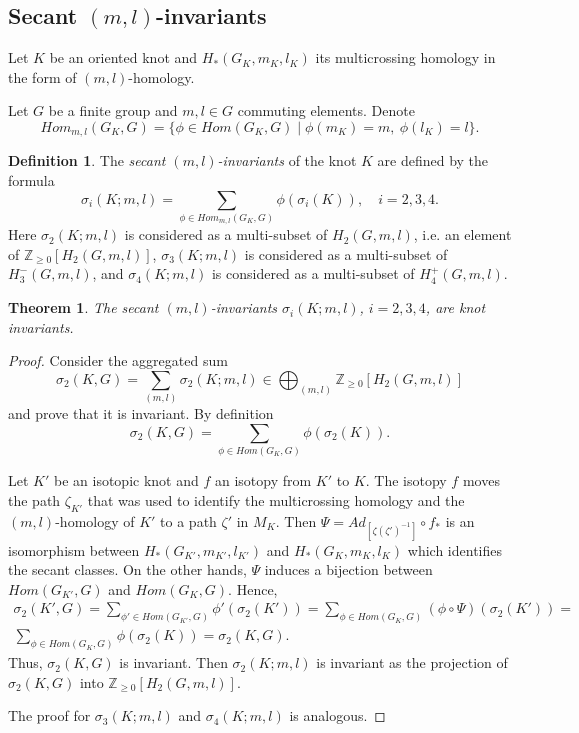 \documentclass{article}
\newtheorem{theorem}{Theorem}
\theoremstyle{definition}
\newtheorem{definition}{Definition}
\theoremstyle{remark}
\def\Z{{\mathbb Z}}
\begin{document}
\subsection{Secant $(m,l)$-invariants}

Let $K$ be an oriented knot and $H_*(G_K,m_K,l_K)$ its multicrossing homology in the form of $(m,l)$-homology.

Let $G$ be a finite group and $m,l\in G$ commuting elements. Denote
\[
Hom_{m,l}(G_K,G)=\{\phi\in Hom(G_K,G)\mid \phi(m_K)=m,\ \phi(l_K)=l\}.
\]

\begin{definition}\label{def:secant_ml_class}
    The \emph{secant $(m,l)$-invariants} of the knot $K$ are defined by the formula
\begin{equation}\label{eq:secant_ml_invariant}
    \sigma_i(K;m,l)=\sum_{\phi\in Hom_{m,l}(G_K,G)} \phi(\sigma_i(K)),\quad i=2,3,4.
\end{equation}
Here $\sigma_2(K;m,l)$ is considered as a multi-subset of $H_2(G,m,l)$, i.e. an element of $\Z_{\ge 0}[H_2(G,m,l)]$, $\sigma_3(K;m,l)$ is considered as a multi-subset of $H_3^-(G,m,l)$, and $\sigma_4(K;m,l)$ is considered as a multi-subset of $H_4^+(G,m,l)$.
\end{definition}

\begin{theorem}\label{thm:secant_ml_invariant}
    The secant $(m,l)$-invariants $\sigma_i(K;m,l)$, $i=2,3,4$, are knot invariants.
\end{theorem}
\begin{proof}
    Consider the aggregated sum
\[
\sigma_2(K,G)=\sum_{(m,l)}\sigma_2(K;m,l)\in \bigoplus_{(m,l)}\Z_{\ge 0}[H_2(G,m,l)]
\]
and prove that it is invariant. By definition
\[
\sigma_2(K,G)=\sum_{\phi\in Hom(G_K,G)} \phi(\sigma_2(K)).
\]

Let $K'$ be an isotopic knot and $f$ an isotopy from $K'$ to $K$. The isotopy $f$ moves the path $\zeta_{K'}$ that was used to identify the multicrossing homology and the $(m,l)$-homology of $K'$ to a path $\zeta'$ in $M_K$. Then $\Psi=Ad_{[\zeta(\zeta')^{-1}]}\circ f_*$ is an isomorphism between $H_*(G_{K'},m_{K'},l_{K'})$ and $H_*(G_K,m_K,l_K)$ which identifies the secant classes. On the other hands, $\Psi$ induces a bijection between $Hom(G_{K'},G)$ and $Hom(G_K,G)$. Hence,
\begin{multline*}
\sigma_2(K',G)=\sum_{\phi'\in Hom(G_{K'},G)} \phi'(\sigma_2(K'))=
\sum_{\phi\in Hom(G_K,G)} (\phi\circ\Psi)(\sigma_2(K'))=\\
\sum_{\phi\in Hom(G_K,G)} \phi(\sigma_2(K))=\sigma_2(K,G).
\end{multline*}
Thus, $\sigma_2(K,G)$ is invariant. Then $\sigma_2(K;m,l)$ is invariant as the projection of $\sigma_2(K,G)$ into $\Z_{\ge 0}[H_2(G,m,l)]$.

The proof for $\sigma_3(K;m,l)$ and $\sigma_4(K;m,l)$ is analogous.
\end{proof}
\end{document}
